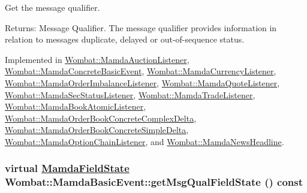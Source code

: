 Get the message qualifier. 

\begin{Desc}
\item[Returns:]Message Qualifier. The message qualifier provides information in relation to messages duplicate, delayed or out-of-sequence status. \end{Desc}


Implemented in \hyperlink{classWombat_1_1MamdaAuctionListener_6bb4128d50574f643efa39dc8edcd9cc}{Wombat::Mamda\-Auction\-Listener}, \hyperlink{classWombat_1_1MamdaConcreteBasicEvent_101e62bfb580c30b876cbb5014b22ab4}{Wombat::Mamda\-Concrete\-Basic\-Event}, \hyperlink{classWombat_1_1MamdaCurrencyListener_e130dc6327ffac134a0302293c4956e9}{Wombat::Mamda\-Currency\-Listener}, \hyperlink{classWombat_1_1MamdaOrderImbalanceListener_5420e2c89b36475cf11a698bda2fdb05}{Wombat::Mamda\-Order\-Imbalance\-Listener}, \hyperlink{classWombat_1_1MamdaQuoteListener_3350ee73b06ee1e205b280b070cea298}{Wombat::Mamda\-Quote\-Listener}, \hyperlink{classWombat_1_1MamdaSecStatusListener_a3f070a7969f59ad8110f20d7743ed16}{Wombat::Mamda\-Sec\-Status\-Listener}, \hyperlink{classWombat_1_1MamdaTradeListener_99049505686f05acab6e3c84c0d0b5b1}{Wombat::Mamda\-Trade\-Listener}, \hyperlink{classWombat_1_1MamdaBookAtomicListener_f51b3cfbfefe29104627fe7fec17f1a2}{Wombat::Mamda\-Book\-Atomic\-Listener}, \hyperlink{classWombat_1_1MamdaOrderBookConcreteComplexDelta_7178498a137a11a1a3631cdd82d40c5a}{Wombat::Mamda\-Order\-Book\-Concrete\-Complex\-Delta}, \hyperlink{classWombat_1_1MamdaOrderBookConcreteSimpleDelta_32a356426ef7b0ddf847983f13f30f94}{Wombat::Mamda\-Order\-Book\-Concrete\-Simple\-Delta}, \hyperlink{classWombat_1_1MamdaOptionChainListener_18b3d2b0c1db64719b2693e89d5583e5}{Wombat::Mamda\-Option\-Chain\-Listener}, and \hyperlink{classWombat_1_1MamdaNewsHeadline_cce176e4bbbebb5e0da87beee835de16}{Wombat::Mamda\-News\-Headline}.\hypertarget{classWombat_1_1MamdaBasicEvent_3454d51e1131d9949691ee4b4153cd97}{
\subsubsection[getMsgQualFieldState]{\setlength{\rightskip}{0pt plus 5cm}virtual \hyperlink{namespaceWombat_93aac974f2ab713554fd12a1fa3b7d2a}{Mamda\-Field\-State} Wombat::Mamda\-Basic\-Event::get\-Msg\-Qual\-Field\-State () const}}
\label{classWombat_1_1MamdaBasicEvent_3454d51e1131d9949691ee4b4153cd97}


